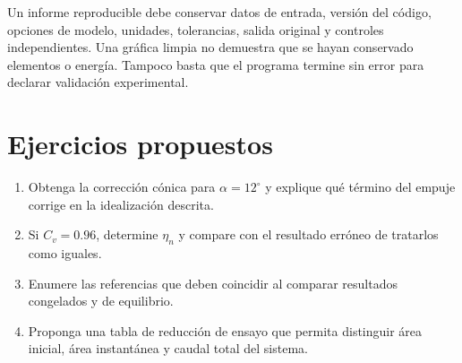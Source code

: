 Un informe reproducible debe conservar datos de entrada, versión del código, opciones de modelo, unidades, tolerancias, salida original y controles independientes. Una gráfica limpia no demuestra que se hayan conservado elementos o energía. Tampoco basta que el programa termine sin error para declarar validación experimental.
\section{Ejercicios propuestos}
\begin{enumerate}
\item Obtenga la corrección cónica para $\alpha=12^\circ$ y explique qué término del empuje corrige en la idealización descrita.
\item Si $C_v=0.96$, determine $\eta_n$ y compare con el resultado erróneo de tratarlos como iguales.
\item Enumere las referencias que deben coincidir al comparar resultados congelados y de equilibrio.
\item Proponga una tabla de reducción de ensayo que permita distinguir área inicial, área instantánea y caudal total del sistema.
\end{enumerate}
